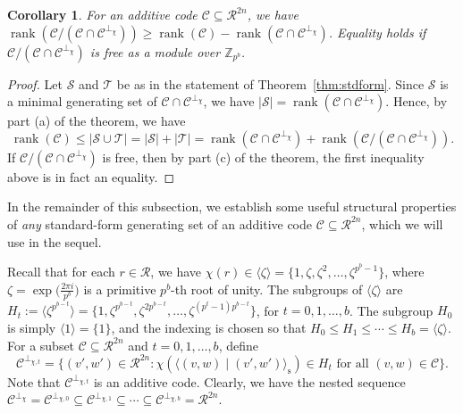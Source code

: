 \documentclass{article}
\DeclareMathOperator{\rank}{rank}
\newtheorem{cor}{Corollary}[section]
\theoremstyle{remark}
\theoremstyle{definition}
\numberwithin{equation}{section}
\begin{document}
\begin{cor}
For an additive code $\mathcal{C} \subseteq \mathcal{R}^{2n}$, we have $\rank(\mathcal{C}/(\mathcal{C} \cap \mathcal{C}^{\perp_\chi})) \ge \rank(\mathcal{C}) - \rank(\mathcal{C} \cap \mathcal{C}^{\perp_\chi})$. Equality holds if $\mathcal{C}/(\mathcal{C} \cap \mathcal{C}^{\perp_\chi})$ is free as a module over $\mathbb{Z}_{p^b}$.
\label{cor:ranks}
\end{cor}
\begin{proof}
Let $\mathcal{S}$ and $\mathcal{T}$ be as in the statement of Theorem~\ref{thm:stdform}. Since $\mathcal{S}$ is a minimal generating set of $\mathcal{C} \cap \mathcal{C}^{\perp_\chi}$, we have $|\mathcal{S}| = \rank(\mathcal{C} \cap \mathcal{C}^{\perp_\chi})$. Hence, by part (a) of the theorem, we have
$$
\rank(\mathcal{C}) \le |\mathcal{S} \cup \mathcal{T}| = |\mathcal{S}| + |\mathcal{T}| = \rank(\mathcal{C} \cap \mathcal{C}^{\perp_\chi}) + \rank(\mathcal{C}/(\mathcal{C} \cap \mathcal{C}^{\perp_\chi})).
$$
If $\mathcal{C}/(\mathcal{C} \cap \mathcal{C}^{\perp_\chi})$ is free, then by part (c) of the theorem, the first inequality above is in fact an equality. 
\end{proof}

In the remainder of this subsection, we establish some useful structural properties of \emph{any} standard-form generating set of an additive code $\mathcal{C} \subseteq \mathcal{R}^{2n}$, which we will use in the sequel.

Recall that for each $r \in \mathcal{R}$, we have $\chi(r)\in \langle \zeta \rangle=\{1,\zeta,\zeta^2,\ldots,\zeta^{p^b-1}\}$, where $\zeta = \exp\bigl(\frac{2 \pi i}{p^b}\bigr)$ is a primitive $p^b$-th root of unity. The subgroups of $\langle \zeta \rangle$ are $H_t := \langle \zeta^{p^{b-t}} \rangle = \{1,\zeta^{p^{b-t}},\zeta^{2p^{b-t}},\ldots,\zeta^{(p^{t}-1)p^{b-t}}\}$, for $t = 0,1,\ldots,b$.  The subgroup $H_0$ is simply $\langle 1 \rangle = \{1\}$, and the indexing is chosen so that $H_0 \le H_1 \leq \cdots \le H_b = \langle \zeta \rangle$. For a subset $\mathcal{C} \subseteq \mathcal{R}^{2n}$ and $t = 0,1,\ldots,b$, define
\begin{equation}
\mathcal{C}^{\perp_{\chi,t}} = \{(v',w') \in \mathcal{R}^{2n}: \chi(\langle(v,w) \mid (v',w')\rangle_{\mathrm{s}}) \in H_t \text{ for all } (v,w) \in \mathcal{C}\}.
\label{def:perp_t}
\end{equation}
Note that $\mathcal{C}^{\perp_{\chi,t}}$ is an additive code. Clearly, we have the nested sequence $\mathcal{C}^{\perp_\chi} = \mathcal{C}^{\perp_{\chi,0}} \subseteq \mathcal{C}^{\perp_{\chi,1}} \subseteq \cdots \subseteq \mathcal{C}^{\perp_{\chi,b}} = \mathcal{R}^{2n}$.
\end{document}
